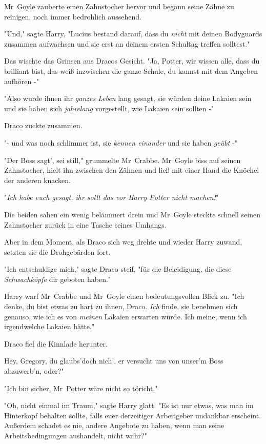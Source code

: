 {Mr~Goyle zauberte einen Zahnstocher hervor und begann seine Zähne zu reinigen, noch immer bedrohlich aussehend.

"Und," sagte Harry, "Lucius bestand darauf, dass du \emph{nicht} mit deinen Bodyguards zusammen aufwachsen und sie erst an deinem ersten Schultag treffen solltest."

Das wischte das Grinsen aus Dracos Gesicht. "Ja, Potter, wir wissen alle, dass du brilliant bist, das weiß inzwischen die ganze Schule, du kannst mit dem Angeben aufhören -"

"Also wurde ihnen ihr \emph{ganzes Leben} lang gesagt, sie würden deine Lakaien sein und sie haben sich \emph{jahrelang} vorgestellt, wie Lakaien sein sollten -"

Draco zuckte zusammen.

"- und was noch schlimmer ist, sie \emph{kennen einander} und sie haben \emph{geübt} -"

"Der Boss sagt', sei still," grummelte Mr~Crabbe. Mr~Goyle biss auf seinen Zahnstocher, hielt ihn zwischen den Zähnen und ließ mit einer Hand die Knöchel der anderen knacken.

"\emph{Ich habe euch gesagt, ihr sollt das vor Harry Potter nicht machen!}"

Die beiden sahen ein wenig belämmert drein und Mr~Goyle steckte schnell seinen Zahnstocher zurück in eine Tasche seines Umhangs.

Aber in dem Moment, als Draco sich weg drehte und wieder Harry zuwand, setzten sie die Drohgebärden fort.

"Ich entschuldige mich," sagte Draco steif, "für die Beleidigung, die diese \emph{Schwachköpfe} dir geboten haben."

Harry warf Mr~Crabbe und Mr~Goyle einen bedeutungsvollen Blick zu. "Ich denke, du bist etwas zu hart zu ihnen, Draco. \emph{Ich} finde, sie benehmen sich genauso, wie ich es von \emph{meinen} Lakaien erwarten würde. Ich meine, wenn ich irgendwelche Lakaien hätte."

Draco fiel die Kinnlade herunter.

Hey, Gregory, du glaubs'doch nich', er versucht uns von unser'm Boss abzuwerb'n, oder?"

"Ich bin sicher, Mr~Potter wäre nicht so töricht."

"Oh, nicht einmal im Traum," sagte Harry glatt. "Es ist nur etwas, was man im Hinterkopf behalten sollte, falls euer derzeitiger Arbeitgeber undankbar erscheint. Außerdem schadet es nie, andere Angebote zu haben, wenn man seine Arbeitsbedingungen aushandelt, nicht wahr?"

}

